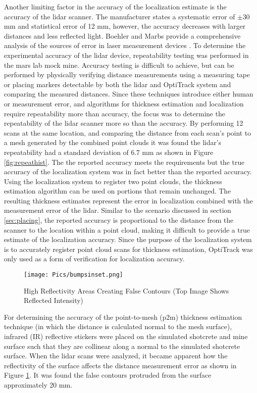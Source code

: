 Another limiting factor in the accuracy of the localization estimate is the accuracy of the \acrshort{lidar} scanner. The manufacturer states a systematic error of $\pm$30 mm and statistical error of 12 mm, however, the accuracy decreases with larger distances and less reflected light. Boehler and Marbs provide a comprehensive analysis of the sources of error in laser measurement devices \cite{checkthebookmarksbar}. To determine the experimental accuracy of the \acrshort{lidar} device, repeatability testing was performed in the \acrshort{mars} lab mock mine. Accuracy testing is difficult to achieve, but can be performed by physically verifying distance measurements using a measuring tape or placing markers detectable by both the \acrshort{lidar} and OptiTrack system and comparing the measured distances. Since these techniques introduce either human or measurement error, and algorithms for thickness estimation and localization require repeatability more than accuracy, the focus was to determine the repeatability of the \acrshort{lidar} scanner more so than the accuracy. By performing 12 scans at the same location, and comparing the distance from each scan's point to a mesh generated by the combined point clouds it was found the \acrshort{lidar}'s repeatability had a standard deviation of 6.7 mm as shown in Figure \ref{fig:repeathist}. The the reported accuracy meets the requirements but the true accuracy of the localization system was in fact better than the reported accuracy. Using the localization system to register two point clouds, the thickness estimation algorithm can be used on portions that remain unchanged. The resulting thickness estimates represent the error in localization combined with the measurement error of the \acrshort{lidar}. Similar to the scenario discussed in section \ref{sec:placing}, the reported accuracy is proportional to the distance from the scanner to the location within a point cloud, making it difficult to provide a true estimate of the localization accuracy. Since the purpose of the localization system is to accurately register point cloud scans for thickness estimation, OptiTrack was only used as a form of verification for localization accuracy.\\
\begin{figure}[hb]
    \centering
    \texttt{[image: Pics/bumpsinset.png]}
    \caption{High Reflectivity Areas Creating False Contours (Top Image Shows Reflected Intensity)}
    \label{fig:bumps}
\end{figure}
\clearpage
For determining the accuracy of the point-to-mesh (\acrshort{p2m}) thickness estimation technique (in which the distance is calculated normal to the mesh surface), infrared (IR) reflective stickers were placed on the simulated shotcrete and mine surface such that they are collinear along a normal to the simulated shotcrete surface. When the \acrshort{lidar} scans were analyzed, it became apparent how the reflectivity of the surface affects the distance measurement error as shown in Figure \ref{fig:bumps}. It was found the false contours protruded from the surface approximately 20 mm.\\

